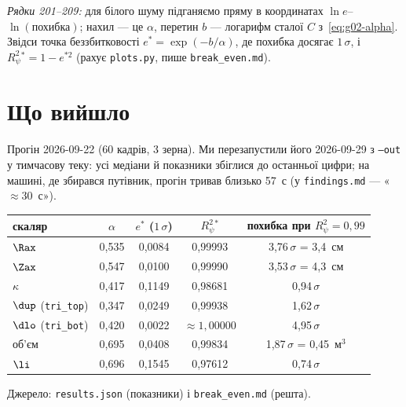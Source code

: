 
\noindent \emph{Рядки 201--209:} для білого шуму підганяємо пряму в координатах
$\ln e$--$\ln(\text{похибка})$; нахил --- це $\alpha$, перетин $b$ --- логарифм сталої $C$
з~\eqref{eq:g02-alpha}. Звідси точка беззбитковості $e^{*}=\exp(-b/\alpha)$, де похибка
досягає $1\,\sigma$, і $R^2_\psi{}^{*}=1-e^{*2}$ (рахує \texttt{plots.py}, пише
\texttt{break\_even.md}).

\section{Що вийшло}\label{sec:g02-results}

Прогін 2026-09-22 (60 кадрів, 3 зерна). Ми перезапустили його 2026-09-29 з
\texttt{--out} у тимчасову теку: усі медіани й показники збіглися до останньої цифри; на
машині, де збирався путівник, прогін тривав близько 57~с (у \texttt{findings.md} --- «$\approx30$~с»).

\begin{center}\small
\begin{tabular}{@{}lcccc@{}}
\toprule
скаляр & $\alpha$ & $e^{*}$ ($1\,\sigma$) & $R^2_\psi{}^{*}$ & похибка при $R^2_\psi=0{,}99$ \\
\midrule
$\Rax$ & 0,535 & 0,0084 & 0,99993 & 3,76$\,\sigma$ = 3,4~см \\
$\Zax$ & 0,547 & 0,0100 & 0,99990 & 3,53$\,\sigma$ = 4,3~см \\
$\kappa$ & 0,417 & 0,1149 & 0,98681 & 0,94$\,\sigma$ \\
$\dup$ (\texttt{tri\_top}) & 0,347 & 0,0249 & 0,99938 & 1,62$\,\sigma$ \\
$\dlo$ (\texttt{tri\_bot}) & 0,420 & 0,0022 & $\approx1{,}00000$ & 4,95$\,\sigma$ \\
об'єм & 0,695 & 0,0408 & 0,99834 & 1,87$\,\sigma$ = 0,45~м$^3$ \\
$\li$ & 0,696 & 0,1545 & 0,97612 & 0,74$\,\sigma$ \\
\bottomrule
\end{tabular}
\end{center}
\noindent Джерело: \texttt{results.json} (показники) і \texttt{break\_even.md} (решта).

